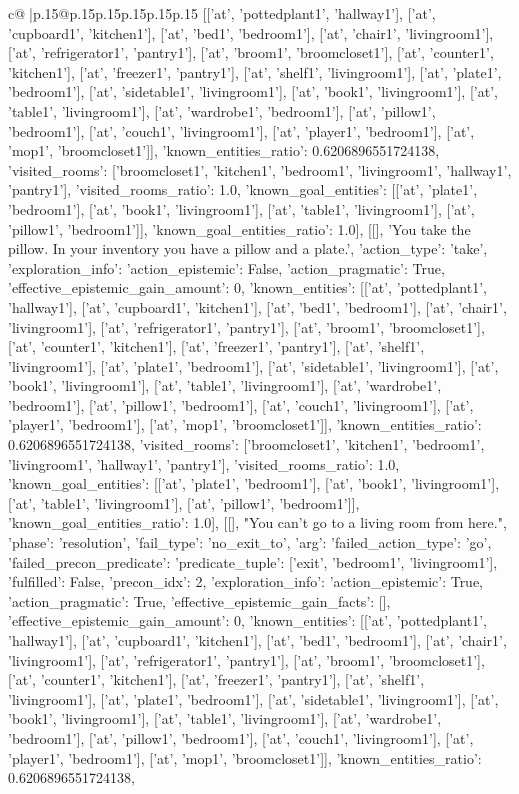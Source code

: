 \documentclass{article}
\begin{document}
{\begin{supertabular}{c@{$\;$}|p{.15\linewidth}@{}p{.15\linewidth}p{.15\linewidth}p{.15\linewidth}p{.15\linewidth}p{.15\linewidth}}
{{{[['at', 'pottedplant1', 'hallway1'], ['at', 'cupboard1', 'kitchen1'], ['at', 'bed1', 'bedroom1'], ['at', 'chair1', 'livingroom1'], ['at', 'refrigerator1', 'pantry1'], ['at', 'broom1', 'broomcloset1'], ['at', 'counter1', 'kitchen1'], ['at', 'freezer1', 'pantry1'], ['at', 'shelf1', 'livingroom1'], ['at', 'plate1', 'bedroom1'], ['at', 'sidetable1', 'livingroom1'], ['at', 'book1', 'livingroom1'], ['at', 'table1', 'livingroom1'], ['at', 'wardrobe1', 'bedroom1'], ['at', 'pillow1', 'bedroom1'], ['at', 'couch1', 'livingroom1'], ['at', 'player1', 'bedroom1'], ['at', 'mop1', 'broomcloset1']], 'known_entities_ratio': 0.6206896551724138, 'visited_rooms': ['broomcloset1', 'kitchen1', 'bedroom1', 'livingroom1', 'hallway1', 'pantry1'], 'visited_rooms_ratio': 1.0, 'known_goal_entities': [['at', 'plate1', 'bedroom1'], ['at', 'book1', 'livingroom1'], ['at', 'table1', 'livingroom1'], ['at', 'pillow1', 'bedroom1']], 'known_goal_entities_ratio': 1.0}}], [[], 'You take the pillow. In your inventory you have a pillow and a plate.', {'action_type': 'take', 'exploration_info': {'action_epistemic': False, 'action_pragmatic': True, 'effective_epistemic_gain_amount': 0, 'known_entities': [['at', 'pottedplant1', 'hallway1'], ['at', 'cupboard1', 'kitchen1'], ['at', 'bed1', 'bedroom1'], ['at', 'chair1', 'livingroom1'], ['at', 'refrigerator1', 'pantry1'], ['at', 'broom1', 'broomcloset1'], ['at', 'counter1', 'kitchen1'], ['at', 'freezer1', 'pantry1'], ['at', 'shelf1', 'livingroom1'], ['at', 'plate1', 'bedroom1'], ['at', 'sidetable1', 'livingroom1'], ['at', 'book1', 'livingroom1'], ['at', 'table1', 'livingroom1'], ['at', 'wardrobe1', 'bedroom1'], ['at', 'pillow1', 'bedroom1'], ['at', 'couch1', 'livingroom1'], ['at', 'player1', 'bedroom1'], ['at', 'mop1', 'broomcloset1']], 'known_entities_ratio': 0.6206896551724138, 'visited_rooms': ['broomcloset1', 'kitchen1', 'bedroom1', 'livingroom1', 'hallway1', 'pantry1'], 'visited_rooms_ratio': 1.0, 'known_goal_entities': [['at', 'plate1', 'bedroom1'], ['at', 'book1', 'livingroom1'], ['at', 'table1', 'livingroom1'], ['at', 'pillow1', 'bedroom1']], 'known_goal_entities_ratio': 1.0}}], [[], "You can't go to a living room from here.", {'phase': 'resolution', 'fail_type': 'no_exit_to', 'arg': {'failed_action_type': 'go', 'failed_precon_predicate': {'predicate_tuple': ['exit', 'bedroom1', 'livingroom1'], 'fulfilled': False, 'precon_idx': 2}}, 'exploration_info': {'action_epistemic': True, 'action_pragmatic': True, 'effective_epistemic_gain_facts': [], 'effective_epistemic_gain_amount': 0, 'known_entities': [['at', 'pottedplant1', 'hallway1'], ['at', 'cupboard1', 'kitchen1'], ['at', 'bed1', 'bedroom1'], ['at', 'chair1', 'livingroom1'], ['at', 'refrigerator1', 'pantry1'], ['at', 'broom1', 'broomcloset1'], ['at', 'counter1', 'kitchen1'], ['at', 'freezer1', 'pantry1'], ['at', 'shelf1', 'livingroom1'], ['at', 'plate1', 'bedroom1'], ['at', 'sidetable1', 'livingroom1'], ['at', 'book1', 'livingroom1'], ['at', 'table1', 'livingroom1'], ['at', 'wardrobe1', 'bedroom1'], ['at', 'pillow1', 'bedroom1'], ['at', 'couch1', 'livingroom1'], ['at', 'player1', 'bedroom1'], ['at', 'mop1', 'broomcloset1']], 'known_entities_ratio': 0.6206896551724138, }}}
\end{supertabular}}
\end{document}

